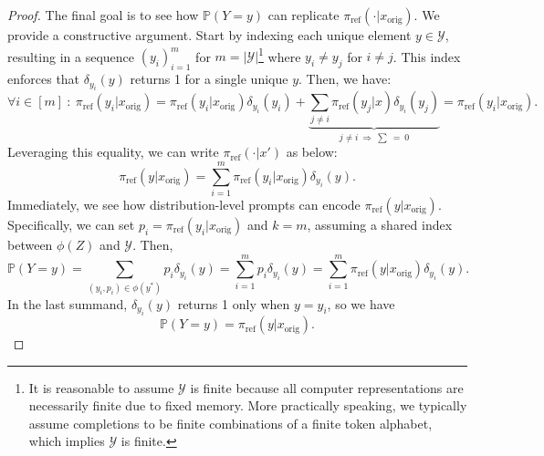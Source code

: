 \begin{proof}
The final goal is to see how $\mathbb{P}(Y = y)$ can replicate $\pi_\textrm{ref}(\cdot | x_\text{orig})$. We provide a constructive argument. Start by indexing each unique element $y \in \mathcal{Y}$, resulting in a sequence $(y_i)_{i=1}^m$ for $m = |\mathcal{Y}|$\footnote{It is reasonable to assume $\mathcal{Y}$ is finite because all computer representations are necessarily finite due to fixed memory. More practically speaking, we typically assume completions to be finite combinations of a finite token alphabet, which implies $\mathcal{Y}$ is finite.} where $y_i \neq y_j$ for $i \neq j$. This index enforces that $\delta_{y_i}(y)$ returns 1 for a single unique $y$. Then, we have:
\begin{equation}
    \forall i \in [m] \ : \ \pi_\text{ref}(y_i | x_\text{orig}) = \pi_\text{ref}(y_i | x_\text{orig}) \delta_{y_i}(y_i) + \underbrace{\sum_{j \neq i} \pi_\text{ref}(y_j | x) \delta_{y_i}(y_j)}_{j \neq i \ \Rightarrow \ \sum \ = \ 0} = \pi_\text{ref}(y_i | x_\text{orig}).
\end{equation}
Leveraging this equality, we can write $\pi_\text{ref}(\cdot | x')$ as below:
\begin{equation}
    \pi_\text{ref}(y | x_\text{orig}) = \sum_{i=1}^m \pi_\text{ref}(y_i | x_\text{orig}) \delta_{y_i}(y).
\end{equation}
Immediately, we see how distribution-level prompts can encode $\pi_\text{ref}(y | x_\text{orig})$. Specifically, we can set $p_i = \pi_\text{ref}(y_i | x_\text{orig})$ and $k=m$, assuming a shared index between $\phi(Z)$ and $\mathcal{Y}$. Then,
\begin{equation}
    \mathbb{P}(Y = y) = \sum_{(y_i,p_i) \in \phi(y^*)}  p_i\delta_{y_i}(y) = \sum_{i=1}^m p_i \delta_{y_i}(y) = \sum_{i=1}^m \pi_\text{ref}(y | x_\text{orig})\delta_{y_i}(y).
\end{equation}
In the last summand, $\delta_{y_i}(y)$ returns 1 only when $y = y_i$, so we have
\begin{equation}
    \mathbb{P}(Y = y) = \pi_\text{ref}(y | x_\text{orig}).
\end{equation}
\end{proof}
